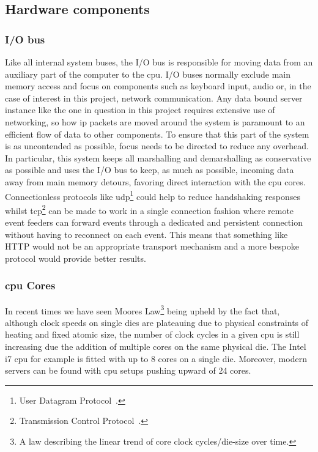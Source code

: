 \documentclass[a4paper,11pt]{scrreprt}
\begin{document}
\subsection{Hardware components}
\subsubsection{I/O bus}
Like all internal system buses, the I/O bus is responsible for moving data from an auxiliary part of the computer to the \acrshort{cpu}. I/O buses normally exclude main memory access and focus on components such as keyboard input, audio or, in the case of interest in this project, network communication. Any data bound server instance like the one in question in this project requires extensive use of networking, so how \acrshort{ip} packets are moved around the system is paramount to an efficient flow of data to other components. To ensure that this part of the system is as uncontended as possible, focus needs to be directed to reduce any overhead. In particular, this system keeps all marshalling and demarshalling as conservative as possible and uses the I/O bus to keep, as much as possible, incoming data away from main memory detours, favoring direct interaction with the \acrshort{cpu} cores. Connectionless protocols like \acrshort{udp}\footnote{User Datagram Protocol~\cite{udp-rfc}.} could help to reduce handshaking responses whilst \acrshort{tcp}\footnote{Transmission Control Protocol~\cite{tcp-rfc}.} can be made to work in a single connection fashion where remote event feeders can forward events through a dedicated and persistent connection without having to reconnect on each event. This means that something like HTTP would not be an appropriate transport mechanism and a more bespoke protocol would provide better results.
\subsubsection{\acrshort{cpu} Cores}
In recent times we have seen Moores Law\footnote{A law describing the linear trend of core clock cycles/die-size over time.} being upheld by the fact that, although clock speeds on single dies are plateauing due to physical constraints of heating and fixed atomic size, the number of clock cycles in a given \acrshort{cpu} is still increasing due the addition of multiple cores on the same physical die. The Intel i7 \acrshort{cpu} for example is fitted with up to 8 cores on a single die. Moreover, modern servers can be found with \acrshort{cpu} setups pushing upward of 24 cores.
\end{document}
